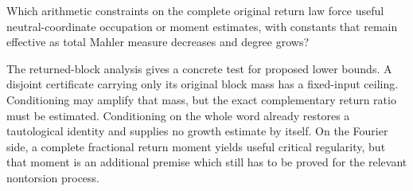 \begin{question}\label{out:neutral}
Which arithmetic constraints on the complete original return law force useful neutral-coordinate occupation or moment estimates, with constants that remain effective as total Mahler measure decreases and degree grows?
\end{question}
The returned-block analysis gives a concrete test for proposed lower bounds.
A disjoint certificate carrying only its original block mass has a fixed-input ceiling.
Conditioning may amplify that mass, but the exact complementary return ratio must be estimated.
Conditioning on the whole word already restores a tautological identity and supplies no growth estimate by itself.
On the Fourier side, a complete fractional return moment yields useful critical regularity, but that moment is an additional premise which still has to be proved for the relevant nontorsion process.


